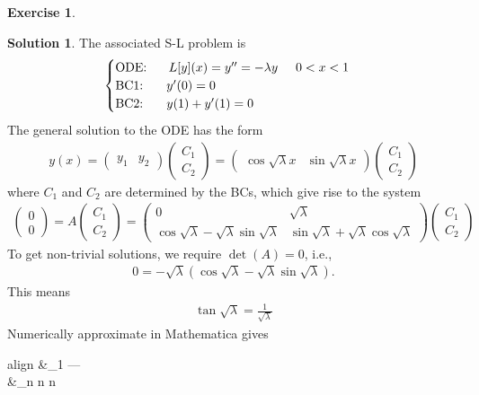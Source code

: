 \documentclass{book}
\theoremstyle{definition}
\newtheorem*{exer*}{Exercise}
\newtheorem*{sln*}{Solution}
\newcommand{\C}{\mathbb{C}}
\newcommand{\f}[2]{\frac{#1}{#2}}
\begin{document}
\begin{exer*}
\begin{enumerate}
\begin{sln*}
			The associated S-L problem is
			\begin{align*}
			\begin{cases}
			\text{ODE: }\hspace{0.5cm} L[y](x) = y'' = -\lambda y\hspace{0.5cm} 0<x<1\\
			\text{BC1: }\hspace{0.5cm} y'(0) = 0\\
			\text{BC2: }\hspace{0.5cm} y(1) + y'(1) = 0
			\end{cases}
			\end{align*}
			The general solution to the ODE has the form
			\begin{align*}
			y(x) = \begin{pmatrix}
			y_1 & y_2
			\end{pmatrix}
			\begin{pmatrix}
			C_1\\C_2
			\end{pmatrix} = 
			\begin{pmatrix}
			\cos\sqrt{\lambda} x & \sin\sqrt{\lambda} x
			\end{pmatrix}
			\begin{pmatrix}
			C_1\\C_2
			\end{pmatrix}
			\end{align*}
			where $C_1$ and $C_2$ are determined by the BCs, which give rise to the system
			\begin{align*}
			\begin{pmatrix}
			0\\0
			\end{pmatrix} = A\begin{pmatrix}
			C_1\\C_2
			\end{pmatrix} = \begin{pmatrix}
			0 &  \sqrt{\lambda}  \\  \cos\sqrt{\lambda} - \sqrt{\lambda}\sin\sqrt{\lambda}  & \sin\sqrt{\lambda} + \sqrt{\lambda}\cos\sqrt{\lambda}
			\end{pmatrix}
			\begin{pmatrix}
			C_1\\C_2
			\end{pmatrix}
			\end{align*}
			To get non-trivial solutions, we require $\det(A) = 0$, i.e., 
			\begin{align*}
			0 =  - \sqrt{\lambda}(\cos\sqrt{\lambda} - \sqrt{\lambda}\sin\sqrt{\lambda}).
			\end{align*}
			This means
			\begin{align*}
			\boxed{\tan\sqrt{\lambda} = \f{1}{\sqrt{\lambda}}}
			\end{align*}
			Numerically approximate in Mathematica gives
			\begin{empheq}[box=\fbox]{align} 
			&\lambda_1 \approx --- \nonumber\\
			&\lambda_n \approx n \hspace{0.5cm} n \nonumber 
			\end{empheq}
			

\end{sln*}
\end{enumerate}
\end{exer*}
\end{document}

